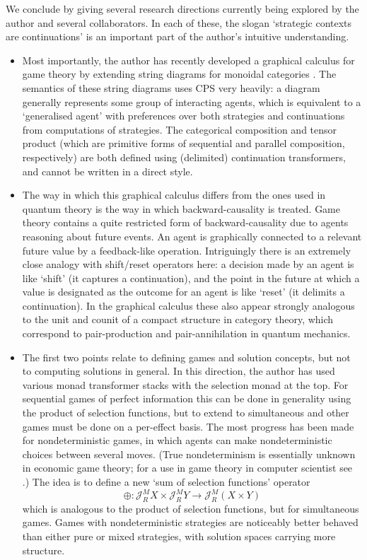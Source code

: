 \documentclass{article}
\newcommand\J{\mathscr J}
\begin{document}
We conclude by giving several research directions currently being explored by the author and several collaborators. In each of these, the slogan `strategic contexts are continuations' is an important part of the author's intuitive understanding.

\begin{itemize}
\item Most importantly, the author has recently developed a graphical calculus for game theory by extending string diagrams for monoidal categories \citep{selinger11}. The semantics of these string diagrams uses CPS very heavily: a diagram generally represents some group of interacting agents, which is equivalent to a `generalised agent' with preferences over both strategies and continuations from computations of strategies. The categorical composition and tensor product (which are primitive forms of sequential and parallel composition, respectively) are both defined using (delimited) continuation transformers, and cannot be written in a direct style.

\item The way in which this graphical calculus differs from the ones used in quantum theory is the way in which backward-causality is treated. Game theory contains a quite restricted form of backward-causality due to agents reasoning about future events. An agent is graphically connected to a relevant future value by a feedback-like operation. Intriguingly there is an extremely close analogy with shift/reset operators \citep{filinski90} here: a decision made by an agent is like `shift' (it captures a continuation), and the point in the future at which a value is designated as the outcome for an agent is like `reset' (it delimits a continuation). In the graphical calculus these also appear strongly analogous to the unit and counit of a compact structure in category theory, which correspond to pair-production and pair-annihilation in quantum mechanics.

\item The first two points relate to defining games and solution concepts, but not to computing solutions in general. In this direction, the author has used various monad transformer stacks with the selection monad at the top. For sequential games of perfect information this can be done in generality using the product of selection functions, but to extend to simultaneous and other games must be done on a per-effect basis. The most progress has been made for nondeterministic games, in which agents can make nondeterministic choices between several moves. (True nondeterminism is essentially unknown in economic game theory; for a use in game theory in computer scientist see \citep[chapter 9]{lavalle06}.) The idea is to define a new `sum of selection functions' operator
\[ \oplus : \J^M_R X \times \J^M_R Y \to \J^M_R (X \times Y) \]
which is analogous to the product of selection functions, but for simultaneous games. Games with nondeterministic strategies are noticeably better behaved than either pure or mixed strategies, with solution spaces carrying more structure.


\end{itemize}
\end{document}
